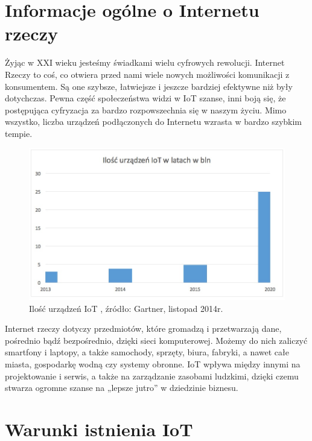 \documentclass[brudnopis]{xmgr}
\begin{document}
\section{Informacje ogólne o Internetu rzeczy}

Żyjąc w XXI wieku jesteśmy świadkami wielu cyfrowych rewolucji. Internet Rzeczy to coś, co otwiera przed nami wiele nowych możliwości komunikacji z konsumentem. Są one szybsze, łatwiejsze i jeszcze bardziej efektywne niż były dotychczas. Pewna część społeczeństwa widzi w IoT szanse, inni boją się, że postępująca cyfryzacja za bardzo rozpowszechnia się w naszym życiu. Mimo wszystko, liczba urządzeń podłączonych do Internetu wzrasta w bardzo szybkim tempie.
\begin{figure}[h]
\centering
\includegraphics[width=12cm]{w}
\caption{Ilość urządzeń IoT , źródło: Gartner, listopad 2014r.}
\end{figure}
Internet rzeczy dotyczy przedmiotów, które gromadzą i przetwarzają dane, pośrednio bądź bezpośrednio, dzięki sieci komputerowej. Możemy do nich zaliczyć smartfony i laptopy, a także samochody, sprzęty, biura, fabryki, a nawet całe miasta, gospodarkę wodną czy systemy obronne. IoT wpływa między innymi na projektowanie i serwis, a także na zarządzanie zasobami ludzkimi, dzięki czemu stwarza ogromne szanse na „lepsze jutro” w dziedzinie biznesu. 

\section{Warunki istnienia IoT}
\end{document}
